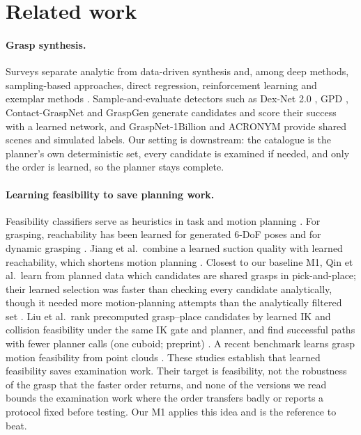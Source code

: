 \documentclass[pdflatex,sn-mathphys-num,iicol]{sn-jnl}
\begin{document}
\section{Related work}\label{sec:related}

\paragraph{Grasp synthesis.} Surveys separate analytic from data-driven synthesis and, among deep methods, sampling-based approaches, direct regression, reinforcement learning and exemplar methods \cite{bohg2014survey,newbury2023review}. Sample-and-evaluate detectors such as Dex-Net 2.0 \cite{mahler2017dexnet2}, GPD \cite{tenpas2017gpd}, Contact-GraspNet \cite{sundermeyer2021contactgraspnet} and GraspGen \cite{murali2026graspgen} generate candidates and score their success with a learned network, and GraspNet-1Billion \cite{fang2020graspnet} and ACRONYM \cite{eppner2021acronym} provide shared scenes and simulated labels. Our setting is downstream: the catalogue is the planner's own deterministic set, every candidate is examined if needed, and only the order is learned, so the planner stays complete.

\paragraph{Learning feasibility to save planning work.} Feasibility classifiers serve as heuristics in task and motion planning \cite{wells2019feasibility}. For grasping, reachability has been learned for generated 6-DoF poses \cite{lou2020reachability} and for dynamic grasping \cite{akinola2021dynamic}. Jiang et al.\ combine a learned suction quality with learned reachability, which shortens motion planning \cite{jiang2022suction}. Closest to our baseline M1, Qin et al.\ learn from planned data which candidates are shared grasps in pick-and-place; their learned selection was faster than checking every candidate analytically, though it needed more motion-planning attempts than the analytically filtered set \cite{qin2026planned}. Liu et al.\ rank precomputed grasp--place candidates by learned IK and collision feasibility under the same IK gate and planner, and find successful paths with fewer planner calls (one cuboid; preprint) \cite{liu2025placement}. A recent benchmark learns grasp motion feasibility from point clouds \cite{ansari2026feasibility}. These studies establish that learned feasibility saves examination work. Their target is feasibility, not the robustness of the grasp that the faster order returns, and none of the versions we read bounds the examination work where the order transfers badly or reports a protocol fixed before testing. Our M1 applies this idea and is the reference to beat.
\end{document}
